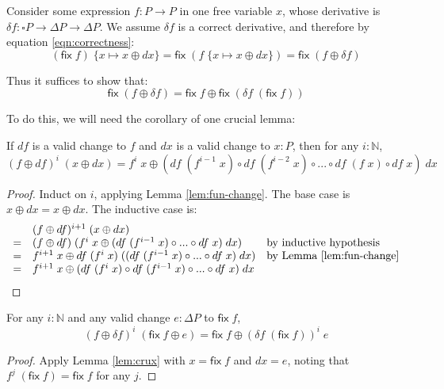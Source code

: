 \documentclass{rntz}
\newcommand{\ms}[1]{\ensuremath{\mathsf{#1}}}
\newcommand{\N}{\mathbb{N}}
\newcommand{\sub}[1]{\;\{{#1}\}}
\newcommand{\Disc}[1]{\square{#1}}
\newcommand{\fix}{\ms{fix}}
\newcommand{\dv}{\delta}
\begin{document}
Consider some expression $f : P \to P$ in one free variable $x$, whose
derivative is $\dv f : \Disc{P} \to \Delta P \to \Delta P$. We assume $\dv f$ is
a correct derivative, and therefore by equation \ref{eqn:correctness}:
\[
  (\fix\;f)\sub{x\mapsto x \oplus dx}
  = \fix\;(f\sub{x\mapsto x \oplus dx})
  = \fix\;(f \oplus \dv f)
\]

Thus it suffices to show that:
\[ \fix\;(f \oplus \dv f) = \fix\;f \oplus \fix\;(\dv f\; (\fix\;f)) \]

To do this, we will need the corollary of one crucial lemma:


\begin{lemma}
  \label{lem:crux} If $df$ is a valid change to $f$ and $dx$ is a valid change to $x : P$, then for any $i : \N$,
  \[
  (f\oplus df)^i \;(x \oplus dx)
  = f^i\;x \oplus
  (df\;(f^{i-1}\;x) \circ df\;(f^{i-2}\;x) \circ ...
  \circ df\;(f\;x) \circ df\;x)\; dx
  \]
\end{lemma}

\begin{proof}
  Induct on $i$, applying Lemma \ref{lem:fun-change}. The base case is $x \oplus
  dx = x \oplus dx$. The inductive case is:
  \[
  \begin{array}{cll}
     & (f \oplus df)^{i+1}\; (x \oplus dx)\\
    =& (f \oplus df)\; (f^i\;x \oplus
    (df \;(f^{i-1}\;x) \circ ... \circ df\;x)\;dx)
    & \text{by inductive hypothesis}\\
    =& f^{i+1}\;x \oplus df\; (f^i\;x) \;
    ((df \;(f^{i-1}\;x) \circ ... \circ df\;x)\;dx)
    & \text{by Lemma \ref{lem:fun-change}}\\
    =& f^{i+1}\;x \oplus
    (df\;(f^i\;x) \circ df\;(f^{i-1}\;x) \circ ... \circ df\;x)\;dx
  \end{array}
  \]
\end{proof}

\begin{theorem}
  \label{thm:crux}
  For any $i : \N$ and any valid change $e : \Delta{P}$ to $\fix\;f$,
  \[
  (f\oplus\dv f)^i \;(\fix\;f \oplus e)
  = \fix\;f \oplus (\dv f \; (\fix\;f))^i \;e
  \]
\end{theorem}
\begin{proof}
  Apply Lemma \ref{lem:crux} with $x = \fix\;f$ and $dx = e$, noting that
  $f^j\;(\fix\;f) = \fix\;f$ for any $j$.
\end{proof}


\end{document}
